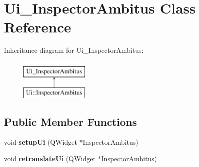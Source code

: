 \hypertarget{class_ui___inspector_ambitus}{}\section{Ui\+\_\+\+Inspector\+Ambitus Class Reference}
\label{class_ui___inspector_ambitus}
Inheritance diagram for Ui\+\_\+\+Inspector\+Ambitus\+:\begin{figure}[H]
\begin{center}
\leavevmode
\includegraphics[height=2.000000cm]{class_ui___inspector_ambitus}
\end{center}
\end{figure}
\subsection*{Public Member Functions}
\begin{DoxyCompactItemize}
\item 
\mbox{\label{class_ui___inspector_ambitus_a1c73c4e3cb7442b61e3bdb3c5dcda421}} 
void {\bfseries setup\+Ui} (Q\+Widget $\ast$Inspector\+Ambitus)
\item 
\mbox{\label{class_ui___inspector_ambitus_a3bb12260a4e6a4d269f5af3384e616e0}} 
void {\bfseries retranslate\+Ui} (Q\+Widget $\ast$Inspector\+Ambitus)
\end{DoxyCompactItemize}
